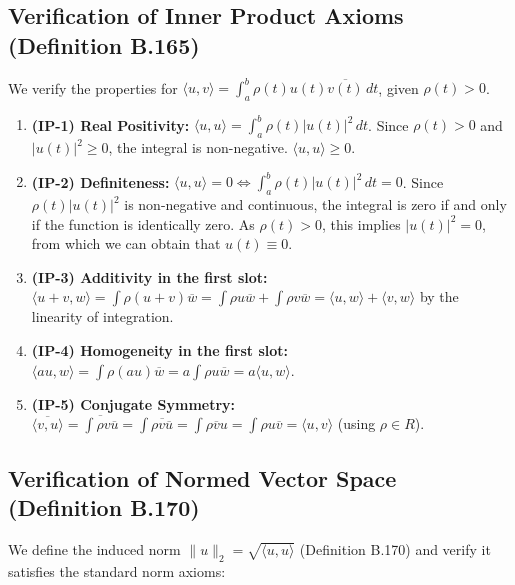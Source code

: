 \documentclass[a4paper]{article}
\begin{document}
\subsection*{Verification of Inner Product Axioms (Definition B.165)}
We verify the properties for $\langle u, v \rangle = \int_{a}^{b} \rho(t) u(t) \overline{v(t)} \, dt$, given $\rho(t) > 0$.

\begin{enumerate}
    \item \textbf{(IP-1) Real Positivity:}
    $\langle u, u \rangle = \int_{a}^{b} \rho(t) |u(t)|^2 \, dt$. Since $\rho(t) > 0$ and $|u(t)|^2 \geq 0$, the integral is non-negative. $\langle u, u \rangle \geq 0$.

    \item \textbf{(IP-2) Definiteness:}
    $\langle u, u \rangle = 0 \iff \int_{a}^{b} \rho(t) |u(t)|^2 \, dt = 0$. Since $\rho(t)|u(t)|^2$ is non-negative and continuous, the integral is zero if and only if the function is identically zero. As $\rho(t) > 0$, this implies $|u(t)|^2 = 0$, from which we can obtain that $u(t) \equiv 0$.

    \item \textbf{(IP-3) Additivity in the first slot:}
    $\langle u + v, w \rangle = \int \rho(u+v)\overline{w} = \int \rho u\overline{w} + \int \rho v\overline{w} = \langle u, w \rangle + \langle v, w \rangle$ by the linearity of integration.

    \item \textbf{(IP-4) Homogeneity in the first slot:}
    $\langle au, w \rangle = \int \rho (au)\overline{w} = a \int \rho u\overline{w} = a\langle u, w \rangle$.

    \item \textbf{(IP-5) Conjugate Symmetry:}
    $\overline{\langle v, u \rangle} = \overline{\int \rho v \overline{u}} = \int \overline{\rho v \overline{u}} = \int \rho \overline{v} u = \int \rho u \overline{v} = \langle u, v \rangle$ (using $\rho \in {R}$).
\end{enumerate}

\subsection*{Verification of Normed Vector Space (Definition B.170)}
We define the induced norm $\|u\|_2 = \sqrt{\langle u, u \rangle}$ (Definition B.170) and verify it satisfies the standard norm axioms:
\end{document}
